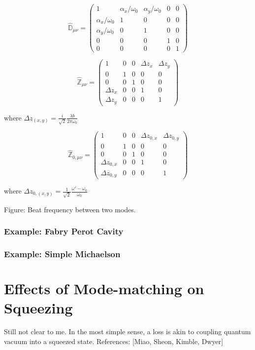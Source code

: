 		\begin{equation} \label{mistrans_matrix}
		\hat{\mathbb{D}}_{\mu \nu} = 
		\begin{pmatrix}
			1					&\alpha_x/\omega_{0}	&\alpha_y/\omega_{0}	& 0 & 0
		\\ \alpha_x/\omega_{0}	&1						&0						& 0 & 0
		\\ \alpha_y/\omega_{0}	&0						&1						& 0	& 0
		\\ 0					&0						&0						& 1	& 0
		\\ 0					&0						&0						& 0 & 1 
		\end{pmatrix}
		\end{equation}
		
		
		\begin{equation} \label{waistloc_matrix}
		\hat{\mathbb{Z}}_{\mu \nu} = 
		\begin{pmatrix}
		1				&0		&0		&\Delta z_x 	&\Delta z_y  
		\\ 0			&1		&0		&0 				&0
		\\ 0			&0		&1		&0 				&0
		\\ \Delta z_x	&0		&0		&1 				&0
		\\ \Delta z_y	&0		&0		&0				&1 
		\end{pmatrix}
		\end{equation}
		
		where $\Delta z_{(x,y)} =  \frac{i}{\sqrt{2}} \frac{\lambda b}{2\pi\omega_{0}} $
		
		
		\begin{equation} \label{waistsize_matrix}
		\hat{\mathbb{Z}}_{0, \mu \nu} = 
		\begin{pmatrix}
		1					&0		&0		&\Delta z_{0,x} 	&\Delta z_{0,y} 
		\\ 0				&1		&0		&0 					&0
		\\ 0				&0		&1		&0 					&0
		\\ \Delta z_{0,x} 	&0		&0		&1 					&0
		\\ \Delta z_{0,y} 	&0		&0		&0					&1 
		\end{pmatrix}
		\end{equation}

		where $\Delta z_{0,(x,y)} =   \frac{1}{\sqrt{2}} \frac{\omega'-\omega_{0}}{\omega_{0}} $

		Figure: Beat frequency between two modes.
		
		
		\subsubsection{Example: Fabry Perot Cavity}
		
		
		\subsubsection{Example: Simple Michaelson}
		
			

		\section{Effects of Mode-matching on Squeezing}
		Still not clear to me.
		In the most simple sense, a loss is akin to coupling quantum vacuum into a squeezed state.
		References: [Miao, Sheon, Kimble, Dwyer]
	
	